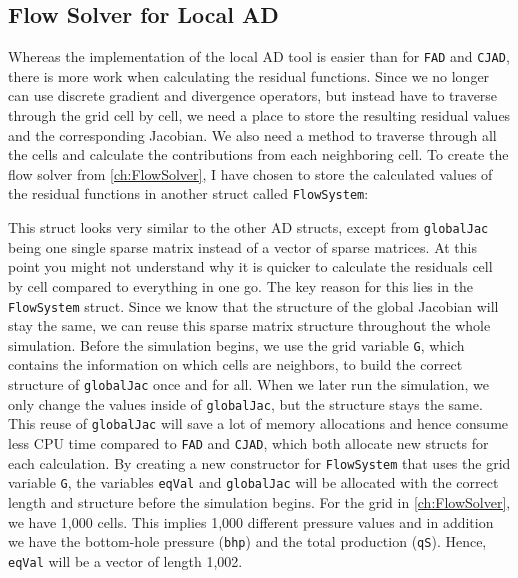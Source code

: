 \subsection{Flow Solver for Local AD}
\label{sec:FlowSolverLADImplementation}
Whereas the implementation of the local AD tool is easier than for \texttt{FAD} and \texttt{CJAD}, there is more work when calculating the residual functions. Since we no longer can use discrete gradient and divergence operators, but instead have to traverse through the grid cell by cell, we need a place to store the resulting residual values and the corresponding Jacobian. We also need a method to traverse through all the cells and calculate the contributions from each neighboring cell. To create the flow solver from \autoref{ch:FlowSolver}, I have chosen to store the calculated values of the residual functions in another struct called \texttt{FlowSystem}:

This struct looks very similar to the other AD structs, except from \texttt{globalJac} being one single sparse matrix instead of a vector of sparse matrices. At this point you might not understand why it is quicker to calculate the residuals cell by cell compared to everything in one go. The key reason for this lies in the \texttt{FlowSystem} struct. Since we know that the structure of the global Jacobian will stay the same, we can reuse this sparse matrix structure throughout the whole simulation. Before the simulation begins, we use the grid variable \texttt{G}, which contains the information on which cells are neighbors, to build the correct structure of \texttt{globalJac} once and for all. When we later run the simulation, we only change the values inside of \texttt{globalJac}, but the structure stays the same. This reuse of \texttt{globalJac} will save a lot of memory allocations and hence consume less CPU time compared to \texttt{FAD} and \texttt{CJAD}, which both allocate new structs for each calculation. By creating a new constructor for \texttt{FlowSystem} that uses the grid variable \texttt{G}, the variables \texttt{eqVal} and \texttt{globalJac} will be allocated with the correct length and structure before the simulation begins. For the grid in \autoref{ch:FlowSolver}, we have 1,000 cells. This implies 1,000 different pressure values and in addition we have the bottom-hole pressure (\texttt{bhp}) and the total production (\texttt{qS}). Hence, \texttt{eqVal} will be a vector of length 1,002.

